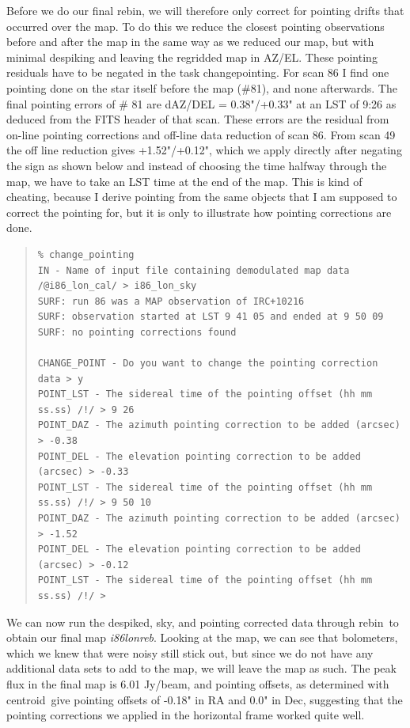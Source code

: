 \documentclass[twoside,11pt]{article}
\newenvironment{myquote}{\begin{quote}\begin{small}}{\end{small}\end{quote}}
\newcommand{\task}[1]{\textsf{#1}}
\newcommand{\rebin}{\xref{\task{rebin}}{sun216}{REBIN}}
\newcommand{\chgpnt}{\xref{\task{change\_pointing}}{sun216}{CHANGE_POINTING}}
\newcommand{\centroid}{\xref{\task{centroid}}{sun95}{CENTROID}}
\newcommand{\xref}[3]{#1}
\renewcommand{\_}{\texttt{\symbol{95}}}
\begin{document}
Before we do our final \rebin, we will therefore only correct for
pointing drifts that occurred over the map.  To do this we reduce the
closest pointing observations before and after the map in the same way
as we reduced our map, but with minimal despiking and leaving the
regridded map in AZ/EL. These pointing residuals have to be negated in
the task \chgpnt. For scan 86 I find one pointing done on the star
itself before the map (\#81), and none afterwards. The final pointing
errors of \# 81 are dAZ/DEL = 0.38"/+0.33" at an LST of 9:26 as deduced
from the FITS header of that scan. These errors are the residual from
on-line pointing corrections and off-line data reduction of scan 86.
From scan 49 the off line reduction gives +1.52"/+0.12", which we apply
directly after negating the sign as shown below and instead of choosing
the time halfway through the map, we have to take an LST time at the
end of the map. This is kind of cheating, because I derive pointing
from the same objects that I am supposed to correct the pointing for, but
it is only to illustrate how pointing corrections are done.

\begin{myquote}
\begin{verbatim}
% change_pointing
IN - Name of input file containing demodulated map data 
/@i86_lon_cal/ > i86_lon_sky
SURF: run 86 was a MAP observation of IRC+10216
SURF: observation started at LST 9 41 05 and ended at 9 50 09
SURF: no pointing corrections found

CHANGE_POINT - Do you want to change the pointing correction data > y
POINT_LST - The sidereal time of the pointing offset (hh mm ss.ss) /!/ > 9 26 
POINT_DAZ - The azimuth pointing correction to be added (arcsec) > -0.38
POINT_DEL - The elevation pointing correction to be added (arcsec) > -0.33
POINT_LST - The sidereal time of the pointing offset (hh mm ss.ss) /!/ > 9 50 10
POINT_DAZ - The azimuth pointing correction to be added (arcsec) > -1.52
POINT_DEL - The elevation pointing correction to be added (arcsec) > -0.12
POINT_LST - The sidereal time of the pointing offset (hh mm ss.ss) /!/ > 
\end{verbatim}
\end{myquote}

We can now run the despiked, sky, and pointing corrected data through
\rebin\ to obtain our final map {\it i86\_lon\_reb}. Looking at the
map, we can see that bolometers, which we knew that were noisy still
stick out, but since we do not have any additional data sets to add to
the map, we will leave the map as such. The peak flux in the final map
is 6.01 Jy/beam, and pointing offsets, as determined with \centroid\
give pointing offsets of -0.18" in RA and 0.0" in Dec, suggesting that
the pointing corrections we applied in the horizontal frame worked
quite well.
\end{document}
